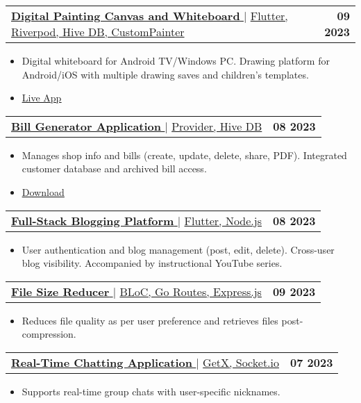 \documentclass[letterpaper,11pt]{article}
\makeatletter
\newcommand{\resumeItem}[1]{
  \item\small{
    {#1 \vspace{-2pt}}
  }
}
\newcommand{\resumeProjectHeading}[2]{
    \item
    \begin{tabular*}{1.001\textwidth}{l@{\extracolsep{\fill}}r}
      \small#1 & \textbf{\small #2}\\
    \end{tabular*}\vspace{-7pt}
}
\newcommand{\resumeItemListStart}{\begin{itemize}}
\newcommand{\resumeItemListEnd}{\end{itemize}\vspace{-5pt}}
\makeatother
\begin{document}
\resumeProjectHeading
{\href{https://play.google.com/store/apps/details?id=com.mylight.shyampatt}{\textbf{\large{\underline{Digital Painting Canvas and Whiteboard}}} \href{https://play.google.com/store/apps/details?id=com.mylight.shyampatt}{\raisebox{-0.1\height}\faExternalLink }} $|$ \large{\underline{Flutter, Riverpod, Hive DB, CustomPainter}}}{09 2023}
\resumeItemListStart
\resumeItem{\normalsize{Digital whiteboard for Android TV/Windows PC. Drawing platform for Android/iOS with multiple drawing saves and children’s templates.}}
\resumeItem{\textcolor{accent}{\href{https://play.google.com/store/apps/details?id=com.mylight.shyampatt}{\underline{\normalsize{Live App}}}}}
\resumeItemListEnd
\vspace{-13pt}

\resumeProjectHeading
{\href{https://play.google.com/store/apps/details?id=com.myligh.parcha.parcha_app}{\textbf{\large{\underline{Bill Generator Application}}} \href{https://play.google.com/store/apps/details?id=com.myligh.parcha.parcha_app}{\raisebox{-0.1\height}\faExternalLink }} $|$ \large{\underline{Provider, Hive DB}}}{08 2023}
\resumeItemListStart
\resumeItem{\normalsize{Manages shop info and bills (create, update, delete, share, PDF). Integrated customer database and archived bill access.}}
\resumeItem{\textcolor{accent}{\href{https://play.google.com/store/apps/details?id=com.myligh.parcha.parcha_app}{\underline{\normalsize{Download}}}}}
\resumeItemListEnd
\vspace{-13pt}


\resumeProjectHeading
{\href{https://youtu.be/aWNm1VBFQII?si=b1k3bZqeIRd4xkF6}{\textbf{\large{\underline{Full-Stack Blogging Platform}}} \href{https://youtu.be/aWNm1VBFQII?si=b1k3bZqeIRd4xkF6}{\raisebox{-0.1\height}\faExternalLink }} $|$ \large{\underline{Flutter, Node.js}}}{08 2023}
\resumeItemListStart
\resumeItem{\normalsize{User authentication and blog management (post, edit, delete). Cross-user blog visibility. Accompanied by instructional YouTube series.}}
\resumeItemListEnd

\resumeProjectHeading
{\href{https://github.com/navneetprajapati26/file_reducer}{\textbf{\large{\underline{File Size Reducer}}} \href{https://github.com/navneetprajapati26/file_reducer}{\raisebox{-0.1\height}\faExternalLink }} $|$ \large{\underline{BLoC, Go Routes, Express.js}}}{09 2023}
\resumeItemListStart
\resumeItem{\normalsize{Reduces file quality as per user preference and retrieves files post-compression.}}
\resumeItemListEnd

\resumeProjectHeading
{\href{https://github.com/navneetprajapati26/chat_app}{\textbf{\large{\underline{Real-Time Chatting Application}}} \href{https://github.com/navneetprajapati26/chat_app}{\raisebox{-0.1\height}\faExternalLink }} $|$ \large{\underline{GetX, Socket.io}}}{07 2023}
\resumeItemListStart
\resumeItem{\normalsize{Supports real-time group chats with user-specific nicknames.}}
\resumeItemListEnd
\end{document}

